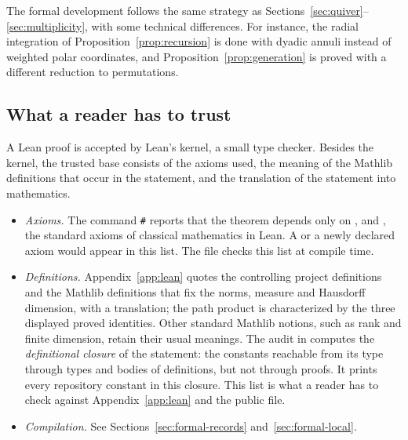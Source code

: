 \documentclass[11pt,a4paper]{article}
\newcommand{\leanhash}{\texttt{\#}}
\theoremstyle{definition}
\theoremstyle{remark}
\numberwithin{equation}{section}
\begin{document}
The formal development follows the same strategy as Sections~\ref{sec:quiver}--\ref{sec:multiplicity}, with some technical differences. For instance, the radial integration of Proposition~\ref{prop:recursion} is done with dyadic annuli instead of weighted polar coordinates, and Proposition~\ref{prop:generation} is proved with a different reduction to permutations.

\subsection{What a reader has to trust}
A Lean proof is accepted by Lean's kernel, a small type checker. Besides the kernel, the trusted base consists of the axioms used, the meaning of the Mathlib definitions that occur in the statement, and the translation of the statement into mathematics.
\begin{itemize}
\item \emph{Axioms.} The command \leanhash{} reports that the theorem depends only on ,  and , the standard axioms of classical mathematics in Lean. A  or a newly declared axiom would appear in this list. The file checks this list at compile time.
\item \emph{Definitions.} Appendix~\ref{app:lean} quotes the controlling project definitions and the Mathlib definitions that fix the norms, measure and Hausdorff dimension, with a translation; the path product is characterized by the three displayed proved identities. Other standard Mathlib notions, such as rank and finite dimension, retain their usual meanings. The audit in  computes the \emph{definitional closure} of the statement: the constants reachable from its type through types and bodies of definitions, but not through proofs. It prints every repository constant in this closure. This list is what a reader has to check against Appendix~\ref{app:lean} and the public file.
\item \emph{Compilation.} See Sections~\ref{sec:formal-records} and~\ref{sec:formal-local}.
\end{itemize}
\end{document}
